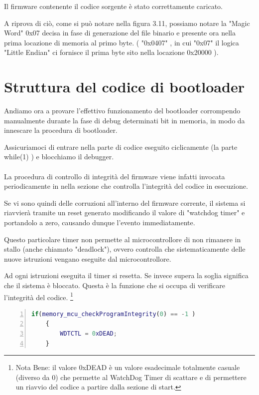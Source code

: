 \documentclass[LaM,binding=0.6cm,oneside]{../sapthesis}
\begin{document}
Il firmware contenente il codice sorgente è stato correttamente caricato. 

A riprova di ciò, come si può notare nella figura 3.11, possiamo notare la "Magic Word" 0x07 decisa in fase di generazione del file binario e presente ora nella prima locazione di memoria al primo byte. ( "0x0407" , in cui "0x07" il logica "Little Endian" ci fornisce il prima byte sito nella locazione 0x20000 ).





\clearpage


\section{Struttura del codice di bootloader}

Andiamo ora a provare l'effettivo funzionamento del bootloader corrompendo manualmente durante la fase di debug determinati bit in memoria, in modo da innescare la procedura di bootloader.

Assicuriamoci di entrare nella parte di codice eseguito ciclicamente (la parte while(1) ) e blocchiamo il debugger.
\\\\
La procedura di controllo di integrità del firmware viene infatti invocata periodicamente in nella sezione che controlla l'integrità del codice in esecuzione.

Se vi sono quindi delle corruzioni all'interno del firmware corrente, il sistema si riavvierà tramite un reset generato modificando il valore di "watchdog timer" e portandolo a zero, causando dunque l'evento immediatamente.

Questo particolare timer non permette al microcontrollore di non rimanere in stallo (anche chiamato "deadlock"), ovvero controlla che sistematicamente delle nuove istruzioni vengano eseguite dal microcontrollore.

Ad ogni istruzioni eseguita il timer si resetta. Se invece supera la soglia significa che il sistema è bloccato.
\newline
Questa è la funzione che si occupa di verificare l’integrità del codice.
\footnote{Nota Bene: il valore 0xDEAD è un valore esadecimale totalmente casuale (diverso da 0) che permette al WatchDog Timer di scattare e di permettere un riavvio del codice a partire dalla sezione di start.}
\begin{lstlisting}[language=Matlab,
                   numbers=left,
                   stepnumber=1,
                   numbersep=10pt,
                   tabsize=4,
                   showspaces=false,
                   showstringspaces=false]
    if(memory_mcu_checkProgramIntegrity(0) == -1 )
    {
        WDTCTL = 0xDEAD;
    }
\end{lstlisting}
\end{document}
